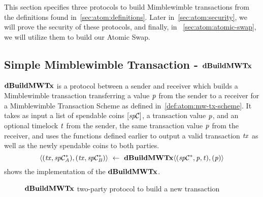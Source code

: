 This section specifies three protocols to build Mimblewimble transactions from the definitions found in~\cref{sec:atom:definitions}.
Later in~\cref{sec:atom:security}, we will prove the security of these protocols, and finally, in ~\cref{sec:atom:atomic-swap}, we will utilize them to build our Atomic Swap.

\subsection{Simple Mimblewimble Transaction - $\mathbf{dBuildMWTx}$} \label{subsec:atom:simple-mw-tx}

$\mathbf{dBuildMWTx}$ is a protocol between a sender and receiver which builds a Mimblewimble transaction transferring a value $\mathit{p}$ from the sender to a receiver for a Mimblewimble Transaction Scheme as defined in~\cref{def:atom:mw-tx-scheme}.
It takes as input a list of spendable coins $[\mathit{sp}\mathcal{C}]$, a transaction value $\mathit{p}$, and an optional timelock $\mathit{t}$ from the sender, the same transaction value $\mathit{p}$ from the receiver, and uses the functions defined earlier to output a valid transaction $\mathit{tx}$ as well as the newly spendable coins to both parties.
\[ \langle (\mathit{tx}, \mathit{sp}\mathcal{C}_{\mathit{A}}^*), (\mathit{tx}, \mathit{sp}\mathcal{C}_{\mathit{B}}^*) \rangle ~\leftarrow~ \mathbf{dBuildMWTx} \langle(\mathit{sp}\mathcal{C}^*,\mathit{p},\mathit{t}), (\mathit{p})\rangle \]
 shows the implementation of the $\mathbf{dBuildMWTx}$.

\begin{figure}
    \begin{center}
    \end{center}
    \caption{$\mathbf{dBuildMWTx}$ two-party protocol to build a new transaction} \label{fig:d-build-mw-tx}
\end{figure}


